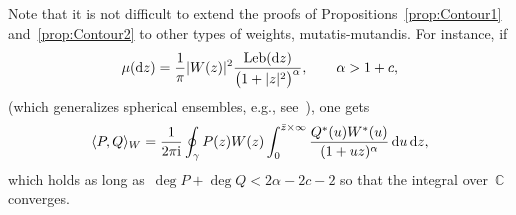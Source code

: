 \documentclass[pdftex]{sigma}
\numberwithin{equation}{section}
\DeclareMathOperator{\Leb}{Leb}
\newcommand*{\Cset}{\mathbb{C}} %
\begin{document}
 Note that it is not difficult to extend the proofs of Propositions~\ref{prop:Contour1} and~\ref{prop:Contour2} to other types of weights, mutatis-mutandis. For instance, if
 \begin{equation*}
 \mu({\rm d}z) = \frac{1}{\pi} |W(z)|^2 \frac{\Leb({\rm d}z)}{\big(1+|z|^2\big)^{\alpha}}, \qquad \alpha> 1+ c,
 \end{equation*}
 (which generalizes spherical ensembles, e.g., see~\cite[Section~2.5]{BF}), one gets
 \begin{equation*}
 \langle P, Q \rangle_W = \frac{1}{2\pi {\rm i}} \oint_{\gamma} P(z) W(z) \int_{0}^{\bar z \times \infty} \frac{Q^*(u) W^*(u)}{(1+uz)^{\alpha}}\,{\rm d}u \, {\rm d}z,
 \end{equation*}
 which holds as long as~$\deg P + \deg Q < 2 \alpha - 2c-2$ so that the integral over~$\Cset$ converges.
\end{document}
